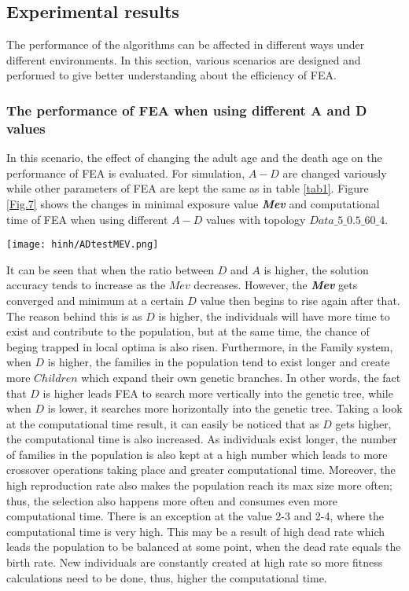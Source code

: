 \documentclass[final]{elsarticle}
\begin{document}
\subsection{Experimental results}
The performance of the algorithms can be affected in different ways under different environments. In this section, various scenarios are designed and performed to give better understanding about the efficiency of FEA.
\subsubsection{The performance of FEA when using different A and D values}
In this scenario, the effect of changing the adult age and the death age on the performance of FEA is evaluated. For simulation, $A - D$ are changed variously while other parameters of FEA are kept the same as in table \ref{tab1}. Figure \ref{Fig.7} shows the changes in minimal exposure value \textit{\textbf{Mev}} and computational time of FEA when using different $A-D$ values with topology $Data\_5\_0.5\_60\_4$.
\begin{figure*}[h]
	\texttt{[image: hinh/ADtestMEV.png]}
	\centering
	\caption{The minimal exposure value when using different A-D values
	}
	\label{Fig.7}       %
\end{figure*}

It can be seen that when the ratio between $D$ and $A$ is higher, the solution accuracy tends to increase as the $Mev$ decreases. However, the \textit{\textbf{Mev}} gets converged and minimum at a certain $D$ value then begins to rise again after that. The reason behind this is as $D$ is higher, the individuals will have more time to exist and contribute to the population, but at the same time, the chance of beging trapped in local optima is also risen. Furthermore, in the Family system, when $D$ is higher, the families in the population tend to exist longer and create more $Children $ which expand their own genetic branches. In other words, the fact that $D$ is higher leads FEA to search more vertically into the genetic tree, while when $D$ is lower, it searches more horizontally into the genetic tree. Taking a look at the computational time result, it can easily be noticed that as $D$ gets higher, the computational time is also increased. As individuals exist longer, the number of families in the population is also kept at a high number which leads to more crossover operations taking place and greater computational time. Moreover, the high reproduction rate also makes the population reach its max size more often; thus, the selection also happens more often and consumes even more computational time. There is an exception at the value 2-3 and 2-4, where the computational time is very high. This may be a result of high dead rate which leads the population to be balanced at some point, when the dead rate equals the birth rate. New individuals are constantly created at high rate so more fitness calculations need to be done, thus, higher the computational time. 
\end{document}
